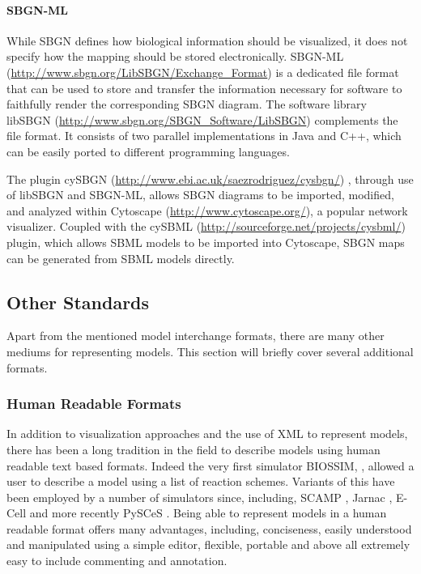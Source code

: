 \paragraph{SBGN-ML}

While SBGN defines how biological information should be visualized, it
does not specify how the mapping should be stored electronically.
SBGN-ML (\url{http://www.sbgn.org/LibSBGN/Exchange_Format})
\autocite{le2010report} is a dedicated file format that can be used to
store and transfer the information necessary for software to faithfully
render the corresponding SBGN diagram. The software library libSBGN
(\url{http://www.sbgn.org/SBGN_Software/LibSBGN}) complements the file
format. It consists of two parallel implementations
\autocite{van2012software} in Java and C++, which can be easily ported
to different programming languages.

The plugin cySBGN (\url{http://www.ebi.ac.uk/saezrodriguez/cysbgn/})
\autocite{goncalves2013cysbgn}, through use of libSBGN and SBGN-ML,
allows SBGN diagrams to be imported, modified, and analyzed within
Cytoscape (\url{http://www.cytoscape.org/}), a popular network
visualizer. Coupled with the cySBML
(\url{http://sourceforge.net/projects/cysbml/})
\autocite{konig2012cysbml} plugin, which allows SBML models to be
imported into Cytoscape, SBGN maps can be generated from SBML models
directly.

\subsection{Other Standards}

Apart from the mentioned model interchange formats, there are many other
mediums for representing models. This section will briefly cover several
additional formats.

\subsubsection{Human Readable Formats}

In addition to visualization approaches and the use of XML to represent
models, there has been a long tradition in the field to describe models
using human readable text based formats. Indeed the very first simulator
BIOSSIM, \autocite{Ga68}, allowed a user to describe a model using a
list of reaction schemes. Variants of this have been employed by a
number of simulators since, including, SCAMP \autocite{SauroF91}, Jarnac
\autocite{sauro:2000}, E-Cell \autocite{ECELL} and more recently PySCeS
\autocite{Pysces2004}. Being able to represent models in a human
readable format offers many advantages, including, conciseness, easily
understood and manipulated using a simple editor, flexible, portable and
above all extremely easy to include commenting and annotation.

